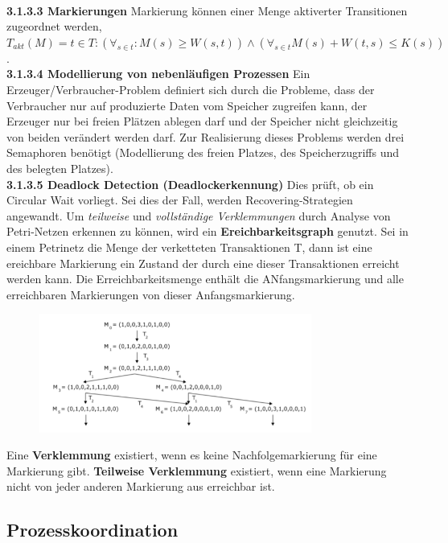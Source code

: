 \documentclass{article}
\begin{document}
    \\
    \textbf{3.1.3.3 Markierungen}\newline
    Markierung können einer Menge aktiverter Transitionen zugeordnet werden, $T_{akt}(M)={t\in T:(\forall_{s\in t}:M(s)\geq W(s,t))\wedge (\forall_{s\in t}M(s)+W(t,s)\leq K(s))}$.\newline
    \\
    \textbf{3.1.3.4 Modellierung von nebenläufigen Prozessen}\newline
    Ein Erzeuger/Verbraucher-Problem definiert sich durch die Probleme, dass der Verbraucher nur auf produzierte Daten vom Speicher zugreifen kann, der Erzeuger nur bei freien Plätzen ablegen darf und der Speicher nicht gleichzeitig von beiden verändert werden darf. Zur Realisierung dieses Problems werden drei Semaphoren benötigt (Modellierung des freien Platzes, des Speicherzugriffs und des belegten Platzes).\newline
    \\
    \textbf{3.1.3.5 Deadlock Detection (Deadlockerkennung)}\newline
    Dies prüft, ob ein Circular Wait vorliegt. Sei dies der Fall, werden Recovering-Strategien angewandt. Um \textit{teilweise} und \textit{vollständige Verklemmungen} durch Analyse von Petri-Netzen erkennen zu können, wird ein \textbf{Ereichbarkeitsgraph} genutzt. Sei in einem Petrinetz die Menge der verketteten Transaktionen T, dann ist eine ereichbare Markierung ein Zustand der durch eine dieser Transaktionen erreicht werden kann. Die Erreichbarkeitsmenge enthält die ANfangsmarkierung und alle erreichbaren Markierungen von dieser Anfangsmarkierung.  
    \begin{figure}[H]
        \centering
	    \includegraphics[width=90mm]{Skizzen/3_Kapitel/erreichbarkeitsgrapf.png}
    \end{figure}\newline
    Eine \textbf{Verklemmung} existiert, wenn es keine Nachfolgemarkierung für eine Markierung gibt. \textbf{Teilweise Verklemmung} existiert, wenn eine Markierung nicht von jeder anderen Markierung aus erreichbar ist.
\subsection{Prozesskoordination}
\end{document}

